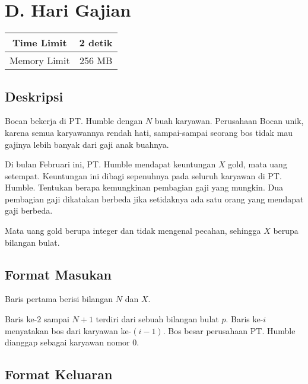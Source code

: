 \documentclass{article}
\begin{document}
\section*{\hfil D. Hari Gajian\hfil}

\begin{center}
\begin{tabular}{ |cc| } 
 \hline
 Time Limit & 2 detik \\
 \hline 
 Memory Limit & 256 MB \\
 \hline
\end{tabular}
\end{center}

\subsection*{Deskripsi}

\par\noindent Bocan bekerja di PT. Humble dengan $N$ buah karyawan. Perusahaan Bocan unik, karena semua karyawannya rendah hati, sampai-sampai seorang bos tidak mau gajinya lebih banyak dari gaji anak buahnya.

\par\noindent Di bulan Februari ini, PT. Humble mendapat keuntungan $X$ gold, mata uang setempat. Keuntungan ini dibagi sepenuhnya pada seluruh karyawan di PT. Humble. Tentukan berapa kemungkinan pembagian gaji yang mungkin. Dua pembagian gaji dikatakan berbeda jika setidaknya ada satu orang yang mendapat gaji berbeda.

\par\noindent Mata uang gold berupa integer dan tidak mengenal pecahan, sehingga $X$ berupa bilangan bulat.

\subsection*{Format Masukan}

\par\noindent Baris pertama berisi bilangan $N$ dan $X$.
\par\noindent Baris ke-$2$ sampai $N+1$ terdiri dari sebuah bilangan bulat $p$. Baris ke-$i$ menyatakan bos dari karyawan ke-$(i-1)$. Bos besar perusahaan PT. Humble dianggap sebagai karyawan nomor $0$.

\subsection*{Format Keluaran}
\end{document}
